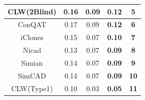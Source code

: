 \documentclass[review]{elsarticle}
\begin{document}
\begin{table}[]
\begin{tabular}{|c|c|c|c|c|}
CLW(2Blind)                                                         & 0.16                                                                   & 0.09                                                                 & \textbf{0.12}                                                         & \textbf{5}                                                                         \\ \hline
ConQAT                                                              & 0.17                                                                   & 0.09                                                                 & \textbf{0.12}                                                         & \textbf{6}                                                                         \\ \hline
iClones                                                             & 0.15                                                                   & 0.07                                                                 & \textbf{0.10}                                                         & \textbf{7}                                                                         \\ \hline
Nicad                                                               & 0.13                                                                   & 0.07                                                                 & \textbf{0.09}                                                         & \textbf{8}                                                                         \\ \hline
Simian                                                              & 0.14                                                                   & 0.07                                                                 & \textbf{0.09}                                                         & \textbf{9}                                                                         \\ \hline
SimCAD                                                              & 0.14                                                                   & 0.07                                                                 & \textbf{0.09}                                                         & \textbf{10}                                                                        \\ \hline
CLW(Type1)                                                          & 0.10                                                                   & 0.03                                                                 & \textbf{0.05}                                                         & \textbf{11}                                                                        \\ \hline

\end{tabular}
\end{table}
\end{document}

